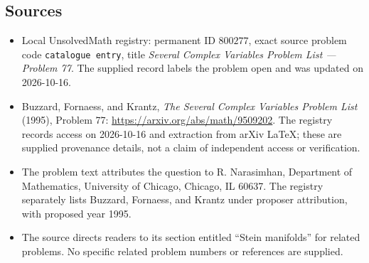 \documentclass[11pt]{article}
\begin{document}
\subsection{Sources}
\begin{itemize}
\item Local UnsolvedMath registry: permanent ID \(800277\), exact source problem code \texttt{catalogue entry}, title \emph{Several Complex Variables Problem List --- Problem 77}. The supplied record labels the problem open and was updated on 2026-10-16.
\item Buzzard, Fornaess, and Krantz, \emph{The Several Complex Variables Problem List} (1995), Problem 77: \url{https://arxiv.org/abs/math/9509202}. The registry records access on 2026-10-16 and extraction from arXiv LaTeX; these are supplied provenance details, not a claim of independent access or verification.
\item The problem text attributes the question to R. Narasimhan, Department of Mathematics, University of Chicago, Chicago, IL 60637. The registry separately lists Buzzard, Fornaess, and Krantz under proposer attribution, with proposed year 1995.
\item The source directs readers to its section entitled ``Stein manifolds'' for related problems. No specific related problem numbers or references are supplied.
\end{itemize}
\end{document}
